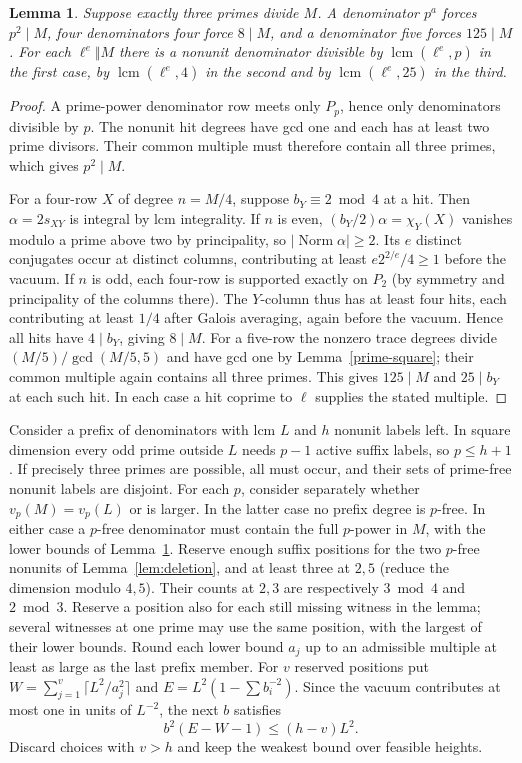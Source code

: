 \documentclass[11pt]{amsart}
\numberwithin{equation}{section}
\newtheorem{lemma}[theorem]{Lemma}
\DeclareMathOperator{\lcm}{lcm}
\begin{document}
\begin{lemma}\label{sq:heights}
Suppose exactly three primes divide $M$. A denominator $p^a$ forces $p^2\mid M$, four denominators four force $8\mid M$, and a denominator five forces $125\mid M$. For each $\ell^e\Vert M$ there is a nonunit denominator divisible by $\lcm(\ell^e,p)$ in the first case, by $\lcm(\ell^e,4)$ in the second and by $\lcm(\ell^e,25)$ in the third.
\end{lemma}
\begin{proof}
A prime-power denominator row meets only $P_p$, hence only denominators divisible by $p$. The nonunit hit degrees have gcd one and each has at least two prime divisors. Their common multiple must therefore contain all three primes, which gives $p^2\mid M$.

For a four-row $X$ of degree $n=M/4$, suppose $b_Y\equiv2\bmod4$ at a hit. Then $\alpha=2s_{XY}$ is integral by lcm integrality. If $n$ is even, $(b_Y/2)\alpha=\chi_Y(X)$ vanishes modulo a prime above two by principality, so $|\operatorname{Norm}\alpha|\ge2$. Its $e$ distinct conjugates occur at distinct columns, contributing at least $e2^{2/e}/4\ge1$ before the vacuum. If $n$ is odd, each four-row is supported exactly on $P_2$ (by symmetry and principality of the columns there). The $Y$-column thus has at least four hits, each contributing at least $1/4$ after Galois averaging, again before the vacuum. Hence all hits have $4\mid b_Y$, giving $8\mid M$. For a five-row the nonzero trace degrees divide $(M/5)/\gcd(M/5,5)$ and have gcd one by Lemma~\ref{prime-square}; their common multiple again contains all three primes. This gives $125\mid M$ and $25\mid b_Y$ at each such hit. In each case a hit coprime to $\ell$ supplies the stated multiple.
\end{proof}

Consider a prefix of denominators with lcm $L$ and $h$ nonunit labels left. In square dimension every odd prime outside $L$ needs $p-1$ active suffix labels, so $p\le h+1$. If precisely three primes are possible, all must occur, and their sets of prime-free nonunit labels are disjoint. For each $p$, consider separately whether $v_p(M)=v_p(L)$ or is larger. In the latter case no prefix degree is $p$-free. In either case a $p$-free denominator must contain the full $p$-power in $M$, with the lower bounds of Lemma~\ref{sq:heights}. Reserve enough suffix positions for the two $p$-free nonunits of Lemma~\ref{lem:deletion}, and at least three at $2,5$ (reduce the dimension modulo $4,5$). Their counts at $2,3$ are respectively $3\bmod4$ and $2\bmod3$. Reserve a position also for each still missing witness in the lemma; several witnesses at one prime may use the same position, with the largest of their lower bounds. Round each lower bound $a_j$ up to an admissible multiple at least as large as the last prefix member. For $v$ reserved positions put $W=\sum_{j=1}^v\lceil L^2/a_j^2\rceil$ and $E=L^2(1-\sum b_i^{-2})$. Since the vacuum contributes at most one in units of $L^{-2}$, the next $b$ satisfies
\[
 b^2(E-W-1)\le (h-v)L^2 .
\]
Discard choices with $v>h$ and keep the weakest bound over feasible heights.
\end{document}
